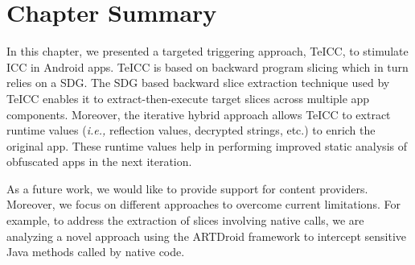 \section{Chapter Summary}
\label{sec:conclusion}
In this chapter, we presented a targeted triggering approach, TeICC, to stimulate ICC in Android apps. TeICC is based on backward program slicing which in turn relies on a SDG. The SDG based backward slice extraction technique used by TeICC enables it to extract-then-execute target slices across multiple app components. Moreover, the iterative hybrid approach allows TeICC to extract runtime values (\textit{i.e.,} reflection values, decrypted strings, etc.) to enrich the original app. These runtime values help in performing improved static analysis of obfuscated apps in the next iteration. 

As a future work, we would like to provide support for content providers. Moreover, we focus on different approaches to overcome current limitations. For example, to address the extraction of slices involving native calls, we are analyzing a novel approach using the ARTDroid \cite{costamagnaartdroid} framework to intercept sensitive Java methods called by native code.